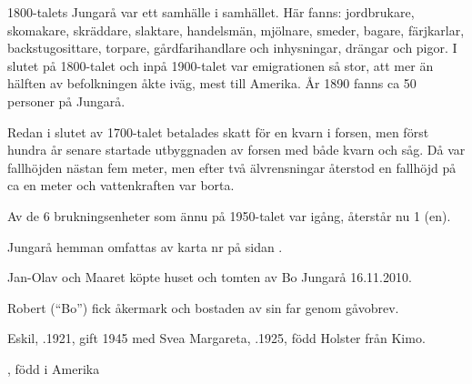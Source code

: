 1800-talets Jungarå var ett samhälle i samhället. Här fanns: jordbrukare, skomakare, skräddare, slaktare, handelsmän, mjölnare, smeder, bagare, färjkarlar, backstugosittare, torpare, gårdfarihandlare och inhysningar, drängar och pigor. I slutet på 1800-talet och inpå 1900-talet var emigrationen så stor, att mer än hälften av befolkningen åkte iväg, mest till Amerika. År 1890 fanns ca 50 personer på Jungarå.

Redan i slutet av 1700-talet betalades skatt för en kvarn i forsen, men först hundra år senare startade utbyggnaden av forsen med både kvarn och såg. Då var fallhöjden nästan fem meter, men efter två älvrensningar återstod en fallhöjd på ca en meter och vattenkraften var borta.

Av de 6 brukningsenheter som ännu på 1950-talet var igång, återstår nu 1 (en).


Jungarå hemman omfattas av karta nr  på sidan \pageref{map:17}.



%



%


%
Jan-Olav och Maaret köpte huset och tomten av Bo Jungarå 16.11.2010.\jhvspace{}


%
Robert (``Bo'') fick åkermark och bostaden av sin far genom gåvobrev.\jhvspace{}



%
Eskil, .1921, gift 1945 med Svea Margareta, .1925, född Holster från Kimo.
\begin{jhchildren}
  \item {}
  \item {}, född i Amerika
\end{jhchildren}

